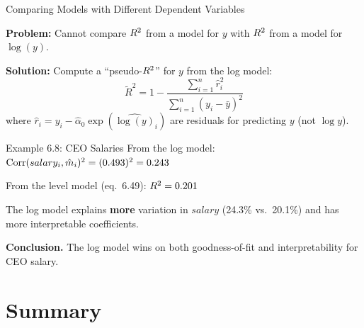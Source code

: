 \documentclass[aspectratio=169, 12pt]{beamer}
\begin{document}
\begin{frame}[shrink=8]{Comparing Models with Different Dependent Variables}

      \textbf{Problem:} Cannot compare $R^2$ from a model
      for $y$ with $R^2$ from a model for $\log(y)$.

      \medskip

      \textbf{Solution:} Compute a ``pseudo-$R^2$'' for $y$
      from the log model:
      \[
        \tilde{R}^2 = 1 - \frac{\sum_{i=1}^{n} \hat{r}_i^2}
                             {\sum_{i=1}^{n} (y_i - \bar{y})^2}
      \]
      where $\hat{r}_i = y_i - \hat\alpha_0 \exp(\widehat{\log(y)}_i)$
      are residuals for predicting $y$ (not $\log y$).
  \medskip

      \begin{examplebox}{Example 6.8: CEO Salaries}
        From the log model:
        $\operatorname{Corr}(salary_i, \hat{m}_i)^2 = (0.493)^2 = 0.243$

        \medskip

        From the level model (eq.\ 6.49):
        $R^2 = 0.201$

        \medskip

        The log model explains \textbf{more} variation
        in $salary$ (24.3\% vs.\ 20.1\%) and has more
        interpretable coefficients.
      \end{examplebox}

      \medskip

      \medskip
      \textbf{Conclusion.} The log model wins on both goodness-of-fit and
      interpretability for CEO salary.

\end{frame}

\section*{Summary}
\end{document}
